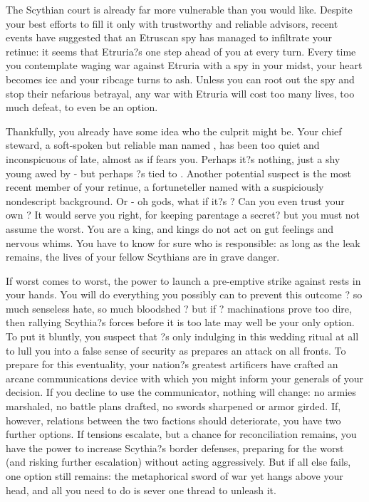\documentclass[char]{Kos}
\begin{document}
    The Scythian court is already far more vulnerable than you would like. Despite your best efforts to fill it only with trustworthy and reliable advisors, recent events have suggested that an Etruscan spy has managed to infiltrate your retinue: it seems that Etruria?s one step ahead of you at every turn. Every time you contemplate waging war against Etruria with a spy in your midst, your heart becomes ice and your ribcage turns to ash. Unless you can root out the spy and stop their nefarious betrayal, any war with Etruria will cost too many lives, too much defeat, to even be an option. 

    Thankfully, you already have some idea who the culprit might be. Your chief steward, a soft-spoken but reliable man named \cButler{}, has been too quiet and inconspicuous of late, almost as if \cButler{\they} fears you. Perhaps it?s nothing, just a shy young \cButler{\human} awed by \cButler{\their} \cScythiaKing{\monarch} - but perhaps \cButler{\they}?s tied to \cEtruriaKing{}. Another potential suspect is the most recent member of your retinue, a fortuneteller named \cBurglar{} with a suspiciously nondescript background. Or - oh gods, what if it?s \cWard{}? Can you even trust your own \cWard{\offspring}? It would serve you right, for keeping \cWard{\their} parentage a secret? but you must not assume the worst. You are a king, and kings do not act on gut feelings and nervous whims. You have to know for sure who is responsible: as long as the leak remains, the lives of your fellow Scythians are in grave danger.

    If worst comes to worst, the power to launch a pre-emptive strike against \cEtruriaKing{} rests in your hands. You will do everything you possibly can to prevent this outcome ? so much senseless hate, so much bloodshed ? but if \cEtruriaKing{}? machinations prove too dire, then rallying Scythia?s forces before it is too late may well be your only option. To put it bluntly, you suspect that \cEtruriaKing{\they}?s only indulging in this wedding ritual at all to lull you into a false sense of security as \cEtruriaKing{\they} prepares an attack on all fronts. To prepare for this eventuality, your nation?s greatest artificers have crafted an arcane communications device with which you might inform your generals of your decision. If you decline to use the communicator, nothing will change: no armies marshaled, no battle plans drafted, no swords sharpened or armor girded. If, however, relations between the two factions should deteriorate, you have two further options. If tensions escalate, but a chance for reconciliation remains, you have the power to increase Scythia?s border defenses, preparing for the worst (and risking further escalation) without acting aggressively. But if all else fails, one option still remains: the metaphorical sword of war yet hangs above your head, and all you need to do is sever one thread to unleash it.
\end{document}
